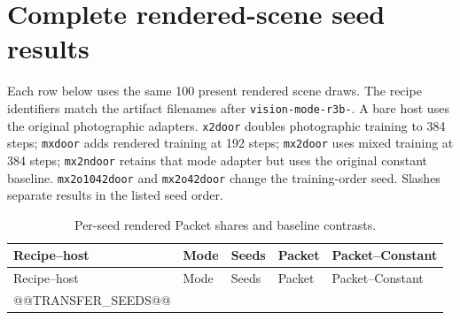 \documentclass[10pt]{article}
\begin{document}
\section{Complete rendered-scene seed results}\label{app:transfer}
Each row below uses the same 100 present rendered scene draws.
The recipe identifiers match the artifact filenames after
\texttt{vision-mode-r3b-}. A bare host uses the original
photographic adapters. \texttt{x2door} doubles photographic
training to 384 steps; \texttt{mxdoor} adds rendered training
at 192 steps; \texttt{mx2door} uses mixed training at 384 steps;
\texttt{mx2ndoor} retains that mode adapter but uses the original
constant baseline. \texttt{mx2o1042door} and
\texttt{mx2o42door} change the training-order seed. Slashes
separate results in the listed seed order.

\small
\begin{longtable}{lll>{\raggedright\arraybackslash}p{1.46in}>{\raggedright\arraybackslash}p{1.46in}}
\caption{Per-seed rendered Packet shares and baseline contrasts.}\\
\toprule
Recipe--host & Mode & Seeds & Packet & Packet--Constant\\\midrule
\endfirsthead
\toprule Recipe--host & Mode & Seeds & Packet & Packet--Constant\\\midrule
\endhead
@@TRANSFER_SEEDS@@
\bottomrule
\end{longtable}
\normalsize
\end{document}
